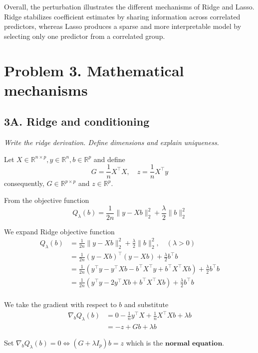 \documentclass[
  11pt,
]{article}
\begin{document}
Overall, the perturbation illustrates the different mechanisms of Ridge
and Lasso. Ridge stabilizes coefficient estimates by sharing information
across correlated predictors, whereas Lasso produces a sparse and more
interpretable model by selecting only one predictor from a correlated
group.

\section{Problem 3. Mathematical
mechanisms}\label{problem-3.-mathematical-mechanisms}

\subsection{3A. Ridge and conditioning}\label{a.-ridge-and-conditioning}

\emph{Write the ridge derivation. Define dimensions and explain
uniqueness.}

Let
\(X \in \mathbb{R}^{n \times p}, y \in \mathbb{R}^n, b \in \mathbb{R}^p\)
and define \[G = \frac{1}{n} X^\top X, \quad
z = \frac{1}{n} X^\top y\] consequently,
\(G \in \mathbb{R}^{p \times p}\) and \(z \in \mathbb{R}^p\).

From the objective function
\[Q_\lambda(b) = \frac{1}{2n}\|y - Xb\|_2^2 + \frac{\lambda}{2}\|b\|_2^2\]

We expand Ridge objective function \begin{align}
  Q_\lambda (b) &= \frac{1}{2n} \|y - X b\|_2^2 + \frac{\lambda}{2} \|b\|_2^2, \quad (\lambda > 0) \\
  &= \frac{1}{2n} (y - X b)^\top (y - X b) + \frac{\lambda}{2} b^\top b \\
  &= \frac{1}{2n} (y^\top y - y^\top X b - b^\top X^\top y + b^\top X^\top X b) + \frac{\lambda}{2} b^\top b \\
  &= \frac{1}{2n} (y^\top y - 2 y^\top X b + b^\top X^\top X b) + \frac{\lambda}{2} b^\top b \\
\end{align}

We take the gradient with respect to \(b\) and substitute \begin{align}
  \nabla_b Q_\lambda (b) &= 0 - \frac{1}{n} y^\top X + \frac{1}{n} X^\top X b + \lambda b \\
  &= - z + G b + \lambda b
\end{align}

Set
\(\nabla_b Q_\lambda (b) = 0 \Leftrightarrow (G + \lambda I_p) b = z\)
which is the \(\textbf{normal equation}\).
\end{document}
